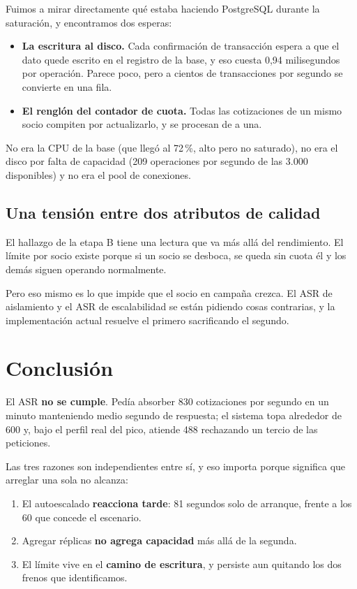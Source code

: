 \documentclass[11pt]{article}
\begin{document}
Fuimos a mirar directamente qué estaba haciendo PostgreSQL durante la saturación, y encontramos dos
esperas:

\begin{itemize}
  \item \textbf{La escritura al disco.} Cada confirmación de transacción espera a que el dato quede
        escrito en el registro de la base, y eso cuesta 0,94 milisegundos por operación. Parece poco,
        pero a cientos de transacciones por segundo se convierte en una fila.
  \item \textbf{El renglón del contador de cuota.} Todas las cotizaciones de un mismo socio compiten
        por actualizarlo, y se procesan de a una.
\end{itemize}

No era la CPU de la base (que llegó al 72\,\%, alto pero no saturado), no era el disco por falta de
capacidad (209 operaciones por segundo de las 3.000 disponibles) y no era el pool de conexiones.


\subsection{Una tensión entre dos atributos de calidad}

El hallazgo de la etapa B tiene una lectura que va más allá del rendimiento. El límite por socio
existe porque si un socio se desboca, se queda sin cuota él y los demás siguen
operando normalmente. 

Pero eso mismo es lo que impide que el socio en campaña crezca. El ASR de aislamiento y el
ASR de escalabilidad se están pidiendo cosas contrarias, y la implementación actual resuelve el
primero sacrificando el segundo. 

\section{Conclusión}

El ASR \textbf{no se cumple}. Pedía absorber 830 cotizaciones por segundo en un minuto manteniendo
medio segundo de respuesta; el sistema topa alrededor de 600 y, bajo el perfil real del pico,
atiende 488 rechazando un tercio de las peticiones.

Las tres razones son independientes entre sí, y eso importa porque significa que arreglar una sola
no alcanza:

\begin{enumerate}
  \item El autoescalado \textbf{reacciona tarde}: 81 segundos solo de arranque, frente a los 60 que
        concede el escenario.
  \item Agregar réplicas \textbf{no agrega capacidad} más allá de la segunda.
  \item El límite vive en el \textbf{camino de escritura}, y persiste aun quitando los dos frenos
        que identificamos.
\end{enumerate}
\end{document}
